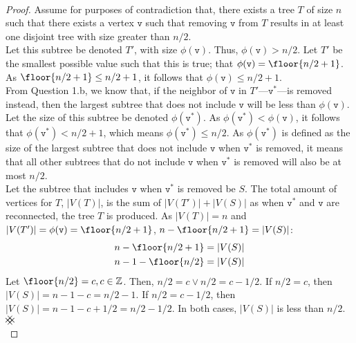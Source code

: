 \documentclass[11pt]{scrartcl}
\theoremstyle{dotlessP}
\theoremstyle{dotlessN}
\newcommand{\ints}{\mathbb{Z}}
\newcommand{\contradiction}{{\hbox{%
    \setbox0=\hbox{$\mkern-3mu\times\mkern-3mu$}%
    \setbox1=\hbox to0pt{\hss$\times$\hss}%
    \copy0\raisebox{0.5\wd0}{\copy1}\raisebox{-0.5\wd0}{\box1}\box0
}}}
\begin{document}
\begin{ans}
	\
	\begin{proof}
		Assume for purposes of contradiction that, there exists a tree $T$ of size $n$ such that there exists a vertex $\texttt{v}$ such that removing $\texttt{v}$ from $T$ results in at least one disjoint tree with size greater than $n/2$.
		\\

		Let this subtree be denoted $T'$, with size $\phi(\texttt{v})$. Thus, $\phi(\texttt{v}) > n/2$. Let $T'$ be the smallest possible value such that this is true; that $\phi(\texttt{v}) = \floor{n/2 + 1}$. As $\floor{n/2 + 1} \leq n/2 + 1$, it follows that $\phi(\texttt{v}) \leq n/2 + 1$. 
\\

From Question 1.b, we know that, if the neighbor of $\texttt{v}$ in $T'$---$\texttt{v}^*$---is removed instead, then the largest subtree that does not include $\texttt{v}$ will be less than  $\phi(\texttt{v})$. Let the size of this subtree be denoted $\phi(\texttt{v}^*)$. As  $\phi(\texttt{v}^*) < \phi(\texttt{v})$, it follows that $\phi(\texttt{v}^*) < n/2 + 1$, which means $\phi(\texttt{v}^*) \leq n/2$. As $\phi(\texttt{v}^*)$ is defined as the size of the largest subtree that does not include $\texttt{v}$ when $\texttt{v}^*$ is removed, it means that all other subtrees that do not include $\texttt{v}$ when $\texttt{v}^*$ is removed will also be at most $n/2$. 
		\\

		Let the subtree that includes $\texttt{v}$ when $\texttt{v}^*$ is removed be $S$. The total amount of vertices for $T$, $|V(T)|$, is the sum of $|V(T')| + |V(S)|$ as when $\texttt{v}^*$ and $\texttt{v}$ are reconnected, the tree $T$ is produced. As $|V(T)| = n$ and $|V(T')| = \phi(\texttt{v}) = \floor{n/2 + 1}$, $n - \floor{n/2 + 1} = |V(S)|$:
		\begin{align*}
			n - \floor{n/2 + 1} &= |V(S)| \\
			n - 1 - \floor{n/2} &= |V(S)|
		\end{align*}
		Let $\floor{n/2} = c, c \in \ints$. Then, $n/2 = c \lor n/2 = c - 1/2$. If $n/2 = c$, then $|V(S)| = n - 1 - c = n/2 - 1$. If $n/2 = c - 1/2$, then $|V(S)| = n - 1 - c + 1/2 = n/2 - 1/2$. In both cases, $|V(S)|$ is less than $n/2$. $\contradiction$
		\\


\end{proof}
\end{ans}
\end{document}
